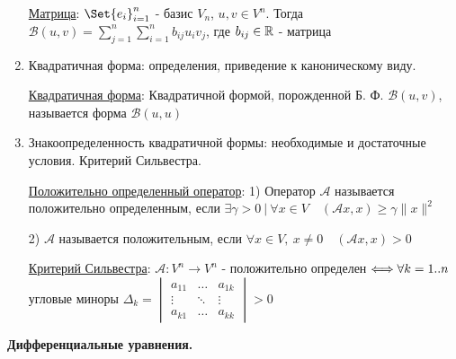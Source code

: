 \documentclass[12pt]{article}
\begin{document}
\begin{enumerate}
        \hyperlink{bilinearformmatrix}{Матрица}: $\Set{e_i}_{i=1}^n$ - базис $V_n$, $u, v \in V^n$. Тогда $\mathcal{B}(u, v) =
        \sum_{j = 1}^{n}\sum_{i = 1}^{n} b_{ij} u_i v_j$, где $b_{ij} \in \mathbb{R}$ - матрица


        \item Квадратичная форма: определения, приведение к каноническому виду.

        \hyperlink{quadraticform}{Квадратичная форма}: Квадратичной формой, порожденной Б. Ф. $\mathcal{B}(u, v)$, называется форма $\mathcal{B}(u, u)$


        \item Знакоопределенность квадратичной формы: необходимые и достаточные условия. Критерий Сильвестра.

        \hyperlink{positivedefinedoperator}{Положительно определенный оператор}: 1) Оператор $\mathcal{A}$ называется положительно определенным, если
        $\exists \gamma > 0 \ | \ \forall x \in V \quad (\mathcal{A}x, x) \geq \gamma \|x\|^2$

        2) $\mathcal{A}$ называется положительным, если
        $\forall x \in V, \ x \neq 0 \quad (\mathcal{A}x, x) > 0$


        \hyperlink{criterionSilvester}{Критерий Сильвестра}: $\mathcal{A}: V^n \to V^n$ - положительно определен $\Longleftrightarrow \\ \forall k = 1..n $ угловые миноры $ \Delta_k =
        \begin{vmatrix}a_{11} & \dots & a_{1k} \\ \vdots & \ddots & \vdots \\ a_{k1} & \dots & a_{kk}\end{vmatrix} > 0$


    \end{enumerate}

    \begin{center}
        \textbf{Дифференциальные уравнения.}
    \end{center}
\end{document}

